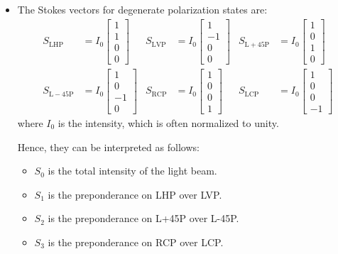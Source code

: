 \documentclass[10pt]{article}
\begin{document}
\begin{itemize}
		\item The Stokes vectors for degenerate polarization states are:
		\begin{align*}
			S_{\mathrm{LHP}} &= I_0 \begin{bmatrix}
				1 \\ 1 \\ 0 \\ 0
			\end{bmatrix} &
			S_{\mathrm{LVP}} &= I_0 \begin{bmatrix}
				1 \\ -1 \\ 0 \\ 0
			\end{bmatrix} &
			S_{\mathrm{L+45P}} &= I_0 \begin{bmatrix}
				1 \\ 0 \\ 1 \\ 0
			\end{bmatrix} \\
			S_{\mathrm{L-45P}} &= I_0 \begin{bmatrix}
				1 \\ 0 \\ -1 \\ 0
			\end{bmatrix} &
			S_{\mathrm{RCP}} &= I_0 \begin{bmatrix}
				1 \\ 0 \\ 0 \\ 1
			\end{bmatrix} &
			S_{\mathrm{LCP}} &= I_0 \begin{bmatrix}
				1 \\ 0 \\ 0 \\ -1
			\end{bmatrix}
		\end{align*}
		where $I_0$ is the intensity, which is often normalized to unity.

		Hence, they can be interpreted as follows:
		\begin{itemize}
			\item $S_0$ is the total intensity of the light beam.
			\item $S_1$ is the preponderance on LHP over LVP.
			\item $S_2$ is the preponderance on L+45P over L-45P.
			\item $S_3$ is the preponderance on RCP over LCP.
		\end{itemize}


\end{itemize}
\end{document}
